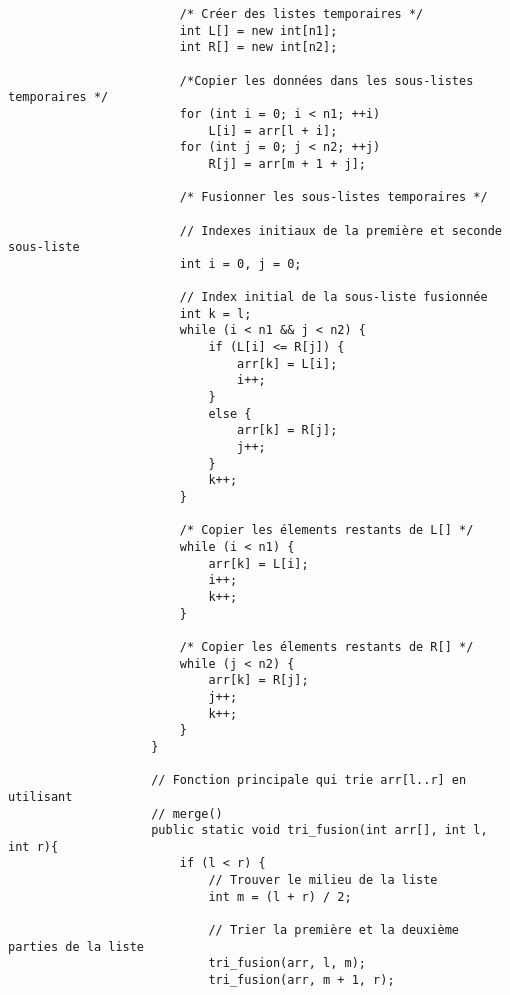 \begin{Exercice} [20 minutes]
\begin{verbatim}
                        /* Créer des listes temporaires */
                        int L[] = new int[n1]; 
                        int R[] = new int[n2]; 
                  
                        /*Copier les données dans les sous-listes temporaires */
                        for (int i = 0; i < n1; ++i) 
                            L[i] = arr[l + i]; 
                        for (int j = 0; j < n2; ++j) 
                            R[j] = arr[m + 1 + j]; 
                  
                        /* Fusionner les sous-listes temporaires */
                  
                        // Indexes initiaux de la première et seconde sous-liste
                        int i = 0, j = 0; 
                  
                        // Index initial de la sous-liste fusionnée
                        int k = l; 
                        while (i < n1 && j < n2) { 
                            if (L[i] <= R[j]) { 
                                arr[k] = L[i]; 
                                i++; 
                            } 
                            else { 
                                arr[k] = R[j]; 
                                j++; 
                            } 
                            k++; 
                        } 
                  
                        /* Copier les élements restants de L[] */
                        while (i < n1) { 
                            arr[k] = L[i]; 
                            i++; 
                            k++; 
                        } 
                  
                        /* Copier les élements restants de R[] */
                        while (j < n2) { 
                            arr[k] = R[j]; 
                            j++; 
                            k++; 
                        }  
                    }
                    
                    // Fonction principale qui trie arr[l..r] en utilisant 
                    // merge() 
                    public static void tri_fusion(int arr[], int l, int r){
                        if (l < r) { 
                            // Trouver le milieu de la liste
                            int m = (l + r) / 2; 
                  
                            // Trier la première et la deuxième parties de la liste
                            tri_fusion(arr, l, m); 
                            tri_fusion(arr, m + 1, r); 
                  

\end{verbatim}
\end{Exercice}
